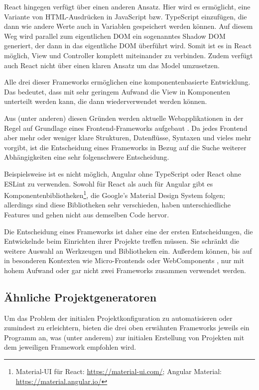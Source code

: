React hingegen verfügt über einen anderen Ansatz. Hier wird es ermöglicht, eine Variante von HTML-Ausdrücken in JavaScript bzw. TypeScript einzufügen, die dann wie andere Werte auch in Variablen gespeichert werden können. Auf diesem Weg wird parallel zum eigentlichen \gls{DOM} ein sogenanntes Shadow DOM generiert, der dann in das eigentliche \gls{DOM} überführt wird. Somit ist es in React möglich, View und Controller komplett miteinander zu verbinden. Zudem verfügt auch React nicht über einen klaren Ansatz um das Model umzusetzen.

Alle drei dieser Frameworks ermöglichen eine komponentenbasierte Entwicklung. Das bedeutet, dass mit sehr geringem Aufwand die View in Komponenten unterteilt werden kann, die dann wiederverwendet werden können.

Aus (unter anderen) diesen Gründen werden aktuelle Webapplikationen in der Regel auf Grundlage eines Frontend-Frameworks aufgebaut \missingQuote. Da jedes Frontend aber mehr oder weniger klare Strukturen, Datenflüsse, Syntaxen und vieles mehr vorgibt, ist die Entscheidung eines Frameworks in Bezug auf die Suche weiterer Abhängigkeiten eine sehr folgenschwere Entscheidung.

Beispielsweise ist es nicht möglich, Angular ohne TypeScript oder React ohne ESLint zu verwenden. Sowohl für React als auch für Angular gibt es Komponentenbibliotheken\footnote{Material-UI für React: \url{https://material-ui.com/}; Angular Material: \url{https://material.angular.io/}}, die Google's Material Design System folgen; allerdings sind diese Bibliotheken sehr verschieden, haben unterschiedliche Features und gehen nicht aus demselben Code hervor.

Die Entscheidung eines Frameworks ist daher eine der ersten Entscheidungen, die Entwickelnde beim Einrichten ihrer Projekte treffen müssen. Sie schränkt die weitere Auswahl an Werkzeugen und Bibliotheken ein. Außerdem können, bis auf in besonderen Kontexten wie Micro-Frontends oder WebComponents \missingQuote, nur mit hohem Aufwand oder gar nicht zwei Frameworks zusammen verwendet werden.

\subsection{Ähnliche Projektgeneratoren}
Um das Problem der initialen Projektkonfiguration zu automatisieren oder zumindest zu erleichtern, bieten die drei oben erwähnten Frameworks jeweils ein Programm an, was (unter anderem) zur initialen Erstellung von Projekten mit dem jeweiligen Framework empfohlen wird.

